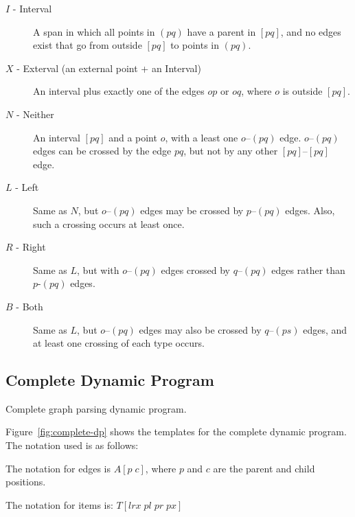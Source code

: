 \begin{description}
  \item[$I$ - Interval]
  A span in which all points in $(pq)$ have a parent in $[pq]$, and no edges exist that go from outside $[pq]$ to points in $(pq)$.
  \item[$X$ - Exterval (an external point + an Interval)]
  An interval plus exactly one of the edges $op$ or $oq$, where $o$ is outside $[pq]$.
  \item[$N$ - Neither]
  An interval $[pq]$ and a point $o$, with a least one $o$--$(pq)$ edge.
  $o$--$(pq)$ edges can be crossed by the edge $pq$, but not by any other $[pq]$--$[pq]$ edge.
  \item[$L$ - Left]
  Same as $N$, but $o$--$(pq)$ edges may be crossed by $p$--$(pq)$ edges. Also, such a crossing occurs at least once. 
  \item[$R$ - Right]
  Same as $L$, but with $o$--$(pq)$ edges crossed by $q$--$(pq)$ edges rather than $p$-$(pq)$ edges.
  \item[$B$ - Both]
  Same as $L$, but $o$--$(pq)$ edges may also be crossed by $q$--$(ps)$ edges, and at least one crossing of each type occurs.
\end{description}

\subsection{Complete Dynamic Program}

\begin{algorithm}
\vspace{-2mm}

\vspace{-10mm}
\caption{
  \label{fig:complete-dp}
  Complete graph parsing dynamic program.
}
\end{algorithm}

Figure~\ref{fig:complete-dp} shows the templates for the complete dynamic program.
The notation used is as follows:

The notation for edges is $A[p \; c]$, where $p$ and $c$ are the parent and child positions.

The notation for items is: $T[lrx \; pl \; pr \; px]$

